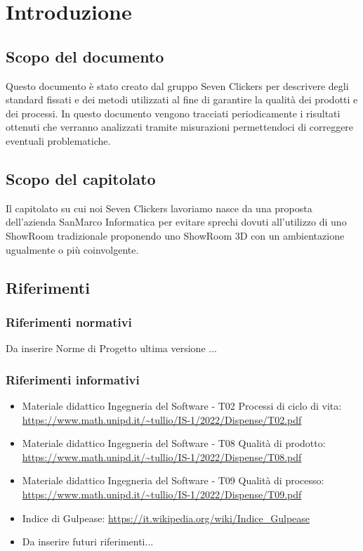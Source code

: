 \section{Introduzione}
\subsection{Scopo del documento}
Questo documento è stato creato dal gruppo Seven Clickers per descrivere degli standard fissati e dei metodi utilizzati al fine di garantire la qualità dei prodotti e dei processi.
In questo documento vengono tracciati periodicamente i risultati ottenuti che verranno analizzati tramite misurazioni permettendoci di correggere eventuali problematiche.

\subsection{Scopo del capitolato}
Il capitolato su cui noi Seven Clickers lavoriamo nasce da una proposta dell'azienda SanMarco Informatica per evitare sprechi dovuti all'utilizzo di uno ShowRoom tradizionale proponendo uno ShowRoom 3D con un ambientazione ugualmente o più coinvolgente.

\subsection{Riferimenti}
\subsubsection{Riferimenti normativi}
Da inserire Norme di Progetto ultima versione ...

\subsubsection{Riferimenti informativi}
\begin{itemize}
	\item Materiale didattico Ingegneria del Software - T02 Processi di ciclo di vita: \url{https://www.math.unipd.it/~tullio/IS-1/2022/Dispense/T02.pdf}
	\item Materiale didattico Ingegneria del Software - T08 Qualità di prodotto: \url{https://www.math.unipd.it/~tullio/IS-1/2022/Dispense/T08.pdf}
	\item Materiale didattico Ingegneria del Software - T09 Qualità di processo: \url{https://www.math.unipd.it/~tullio/IS-1/2022/Dispense/T09.pdf}
	\item Indice di Gulpease: \url{https://it.wikipedia.org/wiki/Indice_Gulpease}
	\item Da inserire futuri riferimenti...
\end{itemize}

